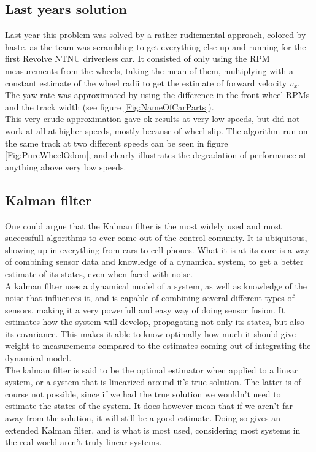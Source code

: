 \subsection{Last years solution}

Last year this problem was solved by a rather rudiemental approach, colored by haste, as the team was scrambling to get everything else up and running for the first Revolve NTNU driverless car. It consisted of only using the RPM measurements from the wheels, taking the mean of them, multiplying with a constant estimate of the wheel radii to get the estimate of forward velocity $v_x$. The yaw rate was approximated by using the difference in the front wheel RPMs and the track width (see figure \ref{Fig:NameOfCarParts}).  \\ 

This very crude approximation gave ok results at very low speeds, but did not work at all at higher speeds, mostly because of wheel slip. The algorithm run on the same track at two different speeds can be seen in figure \ref{Fig:PureWheelOdom}, and clearly illustrates the degradation of performance at anything above very low speeds.   

\subsection{Kalman filter}

One could argue that the Kalman filter is the most widely used and most successfull algorithms to ever come out of the control comunity. It is ubiquitous, showing up in everything from cars to cell phones. What it is at its core is a way of combining sensor data and knowledge of a dynamical system, to get a better estimate of its states, even when faced with noise. \\ 

A kalman filter uses a dynamical model of a system, as well as knowledge of the noise that influences it, and is capable of combining several different types of sensors, making it a very powerfull and easy way of doing sensor fusion. It estimates how the system will develop, propagating not only its states, but also its covariance. This makes it able to know optimally how much it should give weight to measurements compared to the estimates coming out of integrating the dynamical model. \\ 

The kalman filter is said to be the optimal estimator when applied to a linear system, or a system that is linearized around it's true solution. The latter is of course not possible, since if we had the true solution we wouldn't need to estimate the states of the system. It does however mean that if we aren't far away from the solution, it will still be a good estimate. Doing so gives an extended Kalman filter\cite{EKF}, and is what is most used, considering most systems in the real world aren't truly linear systems. \\ 

